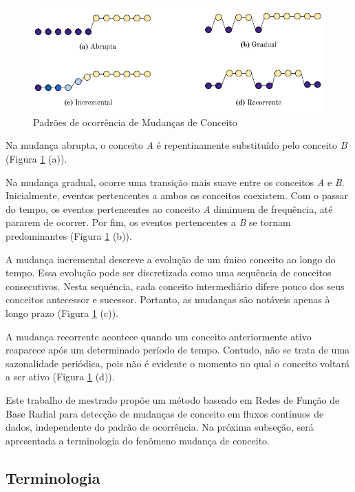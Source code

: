 \documentclass[msc, classic, a4paper]{ufbathesis}
\begin{document}
\begin{figure}[H]
\begin{center}
    \includegraphics[scale=0.8]{imagens/concept_drift_patterns.png}
    \caption{Padrões de ocorrência de Mudanças de Conceito}
    \label{fig:concept_drift_patterns}
\end{center}
\end{figure}

Na mudança abrupta, o conceito \textit{A} é repentinamente substituído pelo conceito \textit{B} (Figura \ref{fig:concept_drift_patterns} (a)).

Na mudança gradual, ocorre uma transição mais suave entre os conceitos \textit{A} e \textit{B}.
Inicialmente, eventos pertencentes a ambos os conceitos coexistem.
Com o passar do tempo, os eventos pertencentes ao conceito \textit{A} diminuem de frequência, até pararem de ocorrer.
Por fim, os eventos pertencentes a \textit{B} se tornam predominantes (Figura \ref{fig:concept_drift_patterns} (b)).

A mudança incremental descreve a evolução de um único conceito ao longo do tempo.
Essa evolução pode ser discretizada como uma sequência de conceitos consecutivos.
Nesta sequência, cada conceito intermediário difere pouco dos seus conceitos antecessor e sucessor.
Portanto, as mudanças são notáveis apenas à longo prazo (Figura \ref{fig:concept_drift_patterns} (c)).

A mudança recorrente acontece quando um conceito anteriormente ativo reaparece após um determinado período de tempo.
Contudo, não se trata de uma sazonalidade periódica, pois não é evidente o momento no qual o conceito voltará a ser ativo (Figura \ref{fig:concept_drift_patterns} (d)).

Este trabalho de mestrado propõe um método baseado em Redes de Função de Base Radial para detecção de mudanças de conceito em fluxos contínuos de dados, independente do padrão de ocorrência.
Na próxima subseção, será apresentada a terminologia do fenômeno mudança de conceito.

\subsection{Terminologia}
\end{document}
